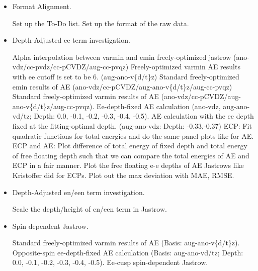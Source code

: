\begin{itemize}
    \item Format Alignment.
    \begin{itemize}
        \done Set up the To-Do list.
        \todo Set up the format of the raw data. 
    \end{itemize}
    \item Depth-Adjusted ee term investigation.
    \begin{itemize}
        \done Alpha interpolation between varmin and emin freely-optimized jastrow (ano-vdz/cc-pvdz/cc-pCVDZ/aug-cc-pvqz)
        \done Freely-optimized varmin AE results with ee cutoff is set to be 6. (aug-ano-v\{d/t\}z)
        \done Standard freely-optimized emin results of AE (ano-vdz/cc-pCVDZ/aug-ano-v\{d/t\}z/aug-cc-pvqz)
        \done Standard freely-optimized varmin results of AE (ano-vdz/cc-pCVDZ/aug-ano-v\{d/t\}z/aug-cc-pvqz).
        \done Ee-depth-fixed AE calculation (ano-vdz, aug-ano-v{d/t}z; Depth: 0.0, -0.1, -0.2, -0.3, -0.4, -0.5).
        \done AE calculation with the ee depth fixed at the fitting-optimal depth. (aug-ano-vdz: Depth: -0.33,-0.37)
        \todo ECP: Fit quadratic functions for total energies and do the same panel plots like for AE.
        \todo ECP and AE: Plot difference of total energy of fixed depth and total energy of free floating depth such that we can compare the total energies of AE and ECP in a fair manner.
        \todo Plot the free floating e-e depths of AE Jastrows like Kristoffer did for ECPs.
        \todo Plot out the max deviation with MAE, RMSE.
    \end{itemize}
    \item Depth-Adjusted en/een term investigation.
    \begin{itemize}
        \todo Scale the depth/height of en/een term in Jastrow.
    \end{itemize}
    \item Spin-dependent Jastrow.
    \begin{itemize}
        \done Standard freely-optimized varmin results of AE (Basis: aug-ano-v\{d/t\}z).
        \done Opposite-spin ee-depth-fixed AE calculation (Basis: aug-ano-v{d/t}z; Depth: 0.0, -0.1, -0.2, -0.3, -0.4, -0.5).
        \todo Ee-cusp spin-dependent Jastrow.
    \end{itemize}
\end{itemize}
